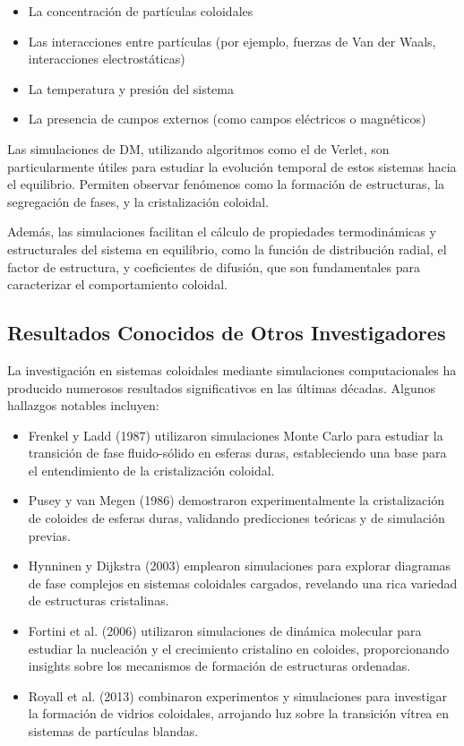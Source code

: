 \documentclass[twocolumn]{article}
\begin{document}
\begin{itemize}
    \item La concentración de partículas coloidales
    \item Las interacciones entre partículas (por ejemplo, fuerzas de Van der Waals, interacciones electrostáticas)
    \item La temperatura y presión del sistema
    \item La presencia de campos externos (como campos eléctricos o magnéticos)
\end{itemize}

Las simulaciones de DM, utilizando algoritmos como el de Verlet, son particularmente útiles para estudiar la evolución temporal de estos sistemas hacia el equilibrio. Permiten observar fenómenos como la formación de estructuras, la segregación de fases, y la cristalización coloidal.

Además, las simulaciones facilitan el cálculo de propiedades termodinámicas y estructurales del sistema en equilibrio, como la función de distribución radial, el factor de estructura, y coeficientes de difusión, que son fundamentales para caracterizar el comportamiento coloidal.
\subsection*{Resultados Conocidos de Otros Investigadores}
La investigación en sistemas coloidales mediante simulaciones computacionales ha producido numerosos resultados significativos en las últimas décadas. Algunos hallazgos notables incluyen:

\begin{itemize}
    \item Frenkel y Ladd (1987) utilizaron simulaciones Monte Carlo para estudiar la transición de fase fluido-sólido en esferas duras, estableciendo una base para el entendimiento de la cristalización coloidal.

    \item Pusey y van Megen (1986) demostraron experimentalmente la cristalización de coloides de esferas duras, validando predicciones teóricas y de simulación previas.

    \item Hynninen y Dijkstra (2003) emplearon simulaciones para explorar diagramas de fase complejos en sistemas coloidales cargados, revelando una rica variedad de estructuras cristalinas.

    \item Fortini et al. (2006) utilizaron simulaciones de dinámica molecular para estudiar la nucleación y el crecimiento cristalino en coloides, proporcionando insights sobre los mecanismos de formación de estructuras ordenadas.

    \item Royall et al. (2013) combinaron experimentos y simulaciones para investigar la formación de vidrios coloidales, arrojando luz sobre la transición vítrea en sistemas de partículas blandas.
\end{itemize}
\end{document}
